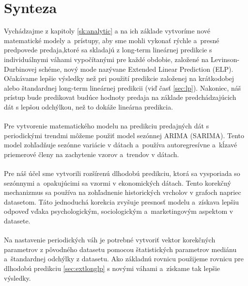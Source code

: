     \section{Synteza}
    Vychádzajme z kapitoly \ref{sk:analytic} a na ich základe vytvoríme nové matematické modely a~prístupy, aby sme mohli
    vykonať rýchle a~presné predpovede predaja,ktoré sa skladajú z long-term lineárnej predikcie s individuálnymi
    váhami vypočítanými pre každé obdobie, založené na Levinson-Durbinovej schéme, nový mode nazývane Extended Linear
    Prediction (ELP). Očakávame lepšie výsledky než pri použití predikcie založenej na krátkodobej alebo štandardnej
    long-term lineárnej predikcii (viď časť \ref{sec:lp}). Nakoniec, náš prístup bude predikovat budúce hodnoty predaja
    na základe predchádzajúcich dát s lepšou odchýlkou, než to dokáže lineárna predikcia.\\
    \\
    Pre vytvorenie matematického modelu na predikciu predajných dát s periodickými trendmi môžeme použiť model
    sezónnej ARIMA (SARIMA). Tento model zohľadňuje sezónne variácie v dátach a~používa autoregresívne a~kĺzavé
    priemerové členy na zachytenie vzorov a~trendov v dátach.\\
    \\
    Pre náš účel sme vytvorili rozšírenú dlhodobú predikciu, ktorá sa vysporiada so sezónnymi a~opakujúcimi sa vzormi
    v ekonomických dátach. Tento korekčný mechanizmus sa používa na zohľadnenie historických vrcholov v grafoch
    napriec datasetom. Táto jednoduchá korekcia zvyšuje presnosť modelu a~získava lepšiu odpoveď
    vďaka psychologickým, sociologickým a~marketingovým aspektom v datasete.\\
    \\
    Na nastavenie periodických váh je potrebné vytvoriť vektor korekčných parametrov z pôvodného datasetu pomocou
    štatistických parametrov mediánu a~štandardnej odchýlky z datasetu. Ako základnú rovnicu použijeme rovnicu pre
    dlhodobú predikciu \ref{sec:extlonglp} s novými váhami a~získame tak lepšie výsledky.

